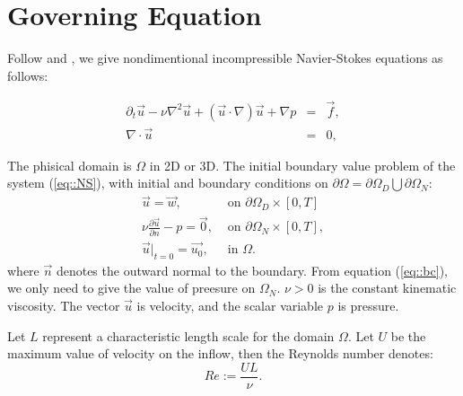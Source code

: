 \documentclass[a4paper, 11pt]{article}
\begin{document}
\section{Governing Equation}

    Follow \cite{elman2005finite} and \cite{popiolek2006numerical}, we
    give nondimentional incompressible Navier-Stokes equations as
    follows:
    
    \begin{equation}
      \begin{array}{rcl}
         \partial_t \vec{u} - \nu \nabla^2 \vec{u} +
        (\vec{u} \cdot \nabla )\vec{u} + \nabla p & =
        & \vec{f},\\
        \nabla \cdot \vec{u} & = & 0,
      \end{array}
      \label{eq::NS}
    \end{equation}

    The phisical domain is $\Omega$ in 2D or 3D. The initial boundary
    value problem of the system (\ref{eq::NS}), with initial and
    boundary conditions on $\partial \Omega = \partial \Omega_D
    \bigcup \partial \Omega_N$:
    \begin{equation}
      \begin{array}{ll}
        \vec{u} = \vec{w},& \mbox{ on } \partial \Omega_D \times [0,
        T]\\
        \nu \displaystyle \frac{\partial \vec{u}}{\partial n} - p =
        \vec{0}, & \mbox{ on } \partial \Omega_N \times [0, T],  \\
        \vec{u}|_{t = 0} = \vec{u_0}, & \mbox{ in } \Omega. 
      \end{array}
      \label{eq::bc}
    \end{equation} 
    where $\vec{n}$ denotes the outward normal to the boundary. From
    equation (\ref{eq::bc}), we only need to give the value of
    preesure on $\Omega_N$. $\nu > 0$ is the constant kinematic
    viscosity. The vector $\vec{u}$ is velocity, and the scalar
    variable $p$ is pressure. 

    Let $L$ represent a characteristic length scale for the domain
    $\Omega$. Let $U$ be the maximum value of velocity on the inflow,
    then the Reynolds number denotes:
    \begin{equation}
      Re := \frac{UL}{\nu}.
    \end{equation}
    
\end{document}
